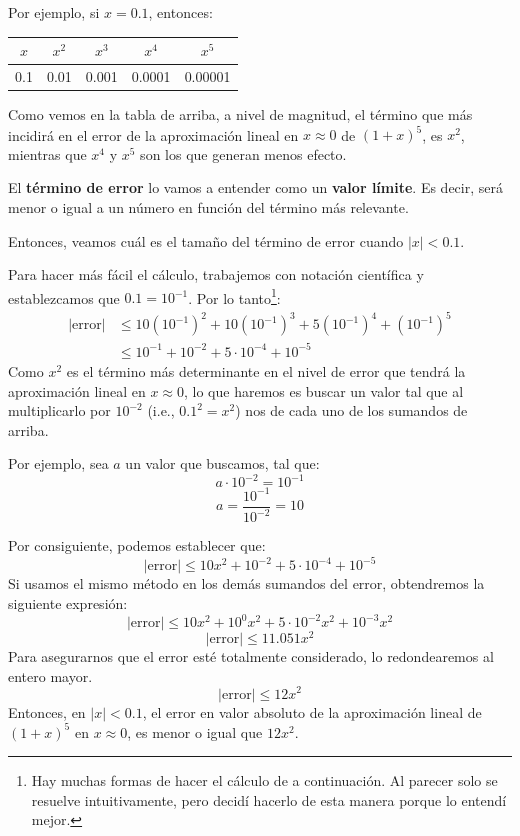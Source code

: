 \documentclass[12pt]{article}
\begin{document}
Por ejemplo, si $x = 0.1$, entonces:

\begin{table}[hbt!]
\begin{tabular}{c | c c c c}
$x$ & $x^{2}$ & $x^{3}$ & $x^{4}$ & $x^{5}$ \\
\hline
0.1 & 0.01 & 0.001 & 0.0001 & 0.00001 \\
\end{tabular}
\centering
\end{table}

Como vemos en la tabla de arriba, a nivel de magnitud, el término que más incidirá en el error de la aproximación lineal en $x \approx 0$ de $(1 + x)^{5}$, es $x^{2}$, mientras que $x^{4}$ y $x^{5}$ son los que generan menos efecto.

El \textbf{término de error} lo vamos a entender como un \textbf{valor límite}. Es decir, será menor o igual a un número en función del término más relevante.

Entonces, veamos cuál es el tamaño del término de error cuando $|x| < 0.1$.

Para hacer más fácil el cálculo, trabajemos con notación científica y establezcamos que $0.1 = 10^{-1}$. Por lo tanto\footnote{Hay muchas formas de hacer el cálculo de a continuación. Al parecer solo se resuelve intuitivamente, pero decidí hacerlo de esta manera porque lo entendí mejor.}:
\begin{align*}
	|\text{error}| &\leq 10(10^{-1})^{2} + 10(10^{-1})^{3} + 5(10^{-1})^{4} + (10^{-1})^{5} \\
	&\leq 10^{-1} + 10^{-2} + 5 \cdot 10^{-4} + 10^{-5}
\end{align*}
Como $x^{2}$ es el término más determinante en el nivel de error que tendrá la aproximación lineal en $x \approx 0$, lo que haremos es buscar un valor tal que al multiplicarlo por $10^{-2}$ (i.e., $0.1^{2} = x^{2}$) nos de cada uno de los sumandos de arriba.

Por ejemplo, sea $a$ un valor que buscamos, tal que:
\[a \cdot 10^{-2} = 10^{-1}\]
\[a = \frac{10^{-1}}{10^{-2}} = 10\]

\newpage

Por consiguiente, podemos establecer que:
\[|\text{error}| \leq 10x^{2} + 10^{-2} + 5 \cdot 10^{-4} + 10^{-5}\]
Si usamos el mismo método en los demás sumandos del error, obtendremos la siguiente expresión:
\[|\text{error}| \leq 10x^{2} + 10^{0}x^{2} + 5 \cdot 10^{-2}x^{2} + 10^{-3}x^{2}\]
\[|\text{error}| \leq 11.051x^{2}\]
Para asegurarnos que el error esté totalmente considerado, lo redondearemos al entero mayor.
\[|\text{error}| \leq 12x^{2}\]
Entonces, en $|x| < 0.1$, el error en valor absoluto de la aproximación lineal de $(1 + x)^{5}$ en $x \approx 0$, es menor o igual que $12x^2$.
\end{document}
